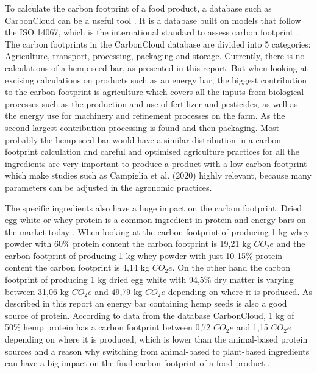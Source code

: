 \vspace{1em}
To calculate the carbon footprint of a food product, a database such as CarbonCloud can be a useful tool \cite*{CarbonCloudClimateHubBenchmark}. It is a database built on models that follow the ISO 14067, which is the international standard to assess carbon footprint \cite*{McLaren2021IntegrationEnvNutritionLCA}. The carbon footprints in the CarbonCloud database are divided into 5 categories: Agriculture, transport, processing, packaging and storage. Currently, there is no calculations of a hemp seed bar, as presented in this report. But when looking at excising calculations on products such as an energy bar, the biggest contribution to the carbon footprint is agriculture which covers all the inputs from biological processes such as the production and use of fertilizer and pesticides, as well as the energy use for machinery and refinement processes on the farm. As the second largest contribution processing is found and then packaging. Most probably the hemp seed bar would have a similar distribution in a carbon footprint calculation and careful and optimised agriculture practices for all the ingredients are very important to produce a product with a low carbon footprint which make studies such as Campiglia et al. (2020) highly relevant, because many parameters can be adjusted in the agronomic practices.

\vspace{1em}
The specific ingredients also have a huge impact on the carbon footprint. Dried egg white or whey protein is a common ingredient in protein and energy bars on the market today \cite*{ProteinKitchenHazelnutsCocoaBar,QuestBlueberryMuffinProteinBar}. When looking at the carbon footprint of producing 1 kg whey powder with 60\% protein content the carbon footprint is 19,21 kg $CO_2e$ and the carbon footprint of producing 1 kg whey powder with just 10-15\% protein content the carbon footprint is 4,14 kg $CO_2e$. On the other hand the carbon footprint of producing 1 kg dried egg white with 94,5\% dry matter is varying between 31,06 kg $CO_2e$ and 49,79 kg $CO_2e$ depending on where it is produced. As described in this report an energy bar containing hemp seeds is also a good source of protein. According to data from the database CarbonCloud, 1 kg of 50\% hemp protein has a carbon footprint between 0,72 $CO_2e$ and 1,15 $CO_2e$ depending on where it is produced, which is lower than the animal-based protein sources and a reason why switching from animal-based to plant-based ingredients can have a big impact on the final carbon footprint of a food product \cite*{CarbonCloudClimateHubBenchmark}.


